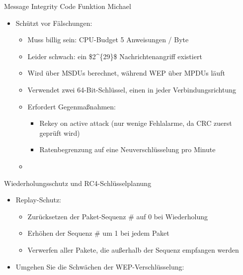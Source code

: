 \documentclass[a4paper]{article}
\begin{document}
\begin{multicols}{3}
    Message Integrity Code Funktion Michael

    \begin{itemize}
        \item
              Schützt vor Fälschungen:

              \begin{itemize}
                  \item
                        Muss billig sein: CPU-Budget 5 Anweisungen / Byte
                  \item
                        Leider schwach: ein \$2\^{}\{29\}\$ Nachrichtenangriff existiert
                  \item
                        Wird über MSDUs berechnet, während WEP über MPDUs läuft
                  \item
                        Verwendet zwei 64-Bit-Schlüssel, einen in jeder Verbindungsrichtung
                  \item
                        Erfordert Gegenmaßnahmen:

                        \begin{itemize}
                            \item
                                  Rekey on active attack (nur wenige Fehlalarme, da CRC zuerst
                                  geprüft wird)
                            \item
                                  Ratenbegrenzung auf eine Neuverschlüsselung pro Minute
                        \end{itemize}
                  \item
              \end{itemize}
    \end{itemize}

    Wiederholungsschutz und RC4-Schlüsselplanung

    \begin{itemize}
        \item
              Replay-Schutz:

              \begin{itemize}
                  \item
                        Zurücksetzen der Paket-Sequenz \# auf 0 bei Wiederholung
                  \item
                        Erhöhen der Sequenz \# um 1 bei jedem Paket
                  \item
                        Verwerfen aller Pakete, die außerhalb der Sequenz empfangen werden
              \end{itemize}
        \item
              Umgehen Sie die Schwächen der WEP-Verschlüsselung:


\end{itemize}
\end{multicols}
\end{document}
